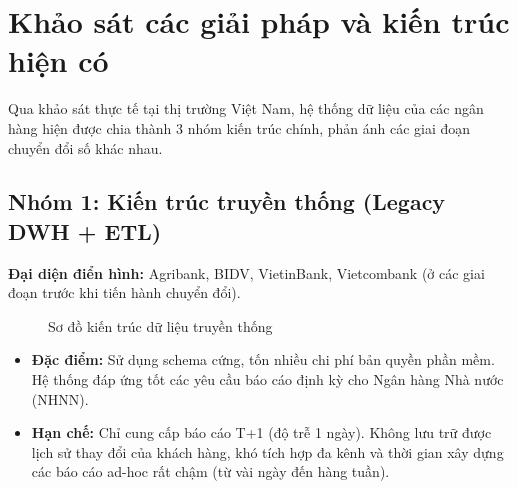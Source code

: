 \section{Khảo sát các giải pháp và kiến trúc hiện có}

Qua khảo sát thực tế tại thị trường Việt Nam, hệ thống dữ liệu của các ngân hàng hiện được chia thành 3 nhóm kiến trúc chính, phản ánh các giai đoạn chuyển đổi số khác nhau.

\subsection{Nhóm 1: Kiến trúc truyền thống (Legacy DWH + ETL)}

\textbf{Đại diện điển hình:} Agribank, BIDV, VietinBank, Vietcombank (ở các giai đoạn trước khi tiến hành chuyển đổi).

\begin{figure}[H]
    \centering
    \caption{Sơ đồ kiến trúc dữ liệu truyền thống}
\end{figure}

\begin{itemize}
    \item \textbf{Đặc điểm:} Sử dụng schema cứng, tốn nhiều chi phí bản quyền phần mềm. Hệ thống đáp ứng tốt các yêu cầu báo cáo định kỳ cho Ngân hàng Nhà nước (NHNN).
    \item \textbf{Hạn chế:} Chỉ cung cấp báo cáo T+1 (độ trễ 1 ngày). Không lưu trữ được lịch sử thay đổi của khách hàng, khó tích hợp đa kênh và thời gian xây dựng các báo cáo ad-hoc rất chậm (từ vài ngày đến hàng tuần).
\end{itemize}

